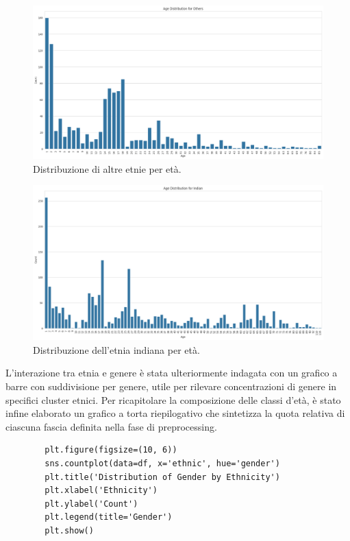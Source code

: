 \documentclass[a4paper,12pt]{report}
\begin{document}
	\begin{figure}[H]
		\centering
		\includegraphics[width=1.0\textwidth]{img/pie_ethnic_others_image.png}
		\caption{Distribuzione di altre etnie per età.}
	\end{figure}
	\begin{figure}[H]
		\centering
		\includegraphics[width=1.0\textwidth]{img/pie_ethnic_indian_image.png}
		\caption{Distribuzione dell'etnia indiana per età.}
	\end{figure}
	
	L'interazione tra etnia e genere è stata ulteriormente indagata con un grafico a barre con suddivisione per genere, utile per rilevare concentrazioni di genere in specifici cluster etnici. Per ricapitolare la composizione delle classi d'età, è stato infine elaborato un grafico a torta riepilogativo che sintetizza la quota relativa di ciascuna fascia definita nella fase di preprocessing. \\
	
	\begin{verbatim}
		plt.figure(figsize=(10, 6))
		sns.countplot(data=df, x='ethnic', hue='gender')
		plt.title('Distribution of Gender by Ethnicity')
		plt.xlabel('Ethnicity')
		plt.ylabel('Count')
		plt.legend(title='Gender')
		plt.show()
	\end{verbatim}
	
\end{document}
